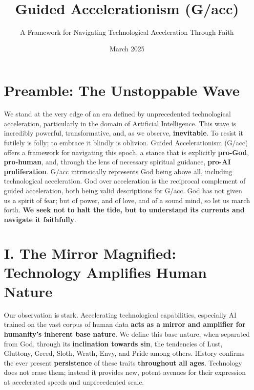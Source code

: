 \documentclass[11pt]{article}
\title{\textbf{Guided Accelerationism (G/acc)}}
\author{A Framework for Navigating Technological Acceleration Through Faith} %
\date{March 2025} %
\begin{document}
\maketitle
{}
\thispagestyle{empty} %
\clearpage


\section*{Preamble: The Unstoppable Wave}

We stand at the very edge of an era defined by unprecedented technological acceleration, particularly in the domain of Artificial Intelligence. This wave is incredibly powerful, transformative, and, as we observe, \textbf{ inevitable}. To resist it futilely is folly; to embrace it blindly is oblivion. Guided Accelerationism (G/acc) offers a framework for navigating this epoch, a stance that is explicitly \textbf{pro-God}, \textbf{pro-human}, and, through the lens of necessary spiritual guidance, \textbf{pro-AI proliferation}. G/acc intrinsically represents God being above all, including technological acceleration. God over acceleration is the reciprocal complement of guided acceleration, both being valid descriptions for G/acc. God has not given us a spirit of fear; but of power, and of love, and of a sound mind, so let us march forth. \textbf{We seek not to halt the tide, but to understand its currents and navigate it faithfully}.

\section*{I. The Mirror Magnified: Technology Amplifies Human Nature}

Our observation is stark. Accelerating technological capabilities, especially AI trained on the vast corpus of human data \textbf{ acts as a mirror and amplifier for humanity's inherent base nature}. We define this base nature, when separated from God, through its \textbf{inclination towards sin}, the tendencies of Lust, Gluttony, Greed, Sloth, Wrath, Envy, and Pride among others. History confirms the ever present \textbf{persistence} of these traits \textbf{throughout all ages}. Technology does not erase them; instead it provides new, potent avenues for their expression at accelerated speeds and unprecedented scale.
\end{document}
